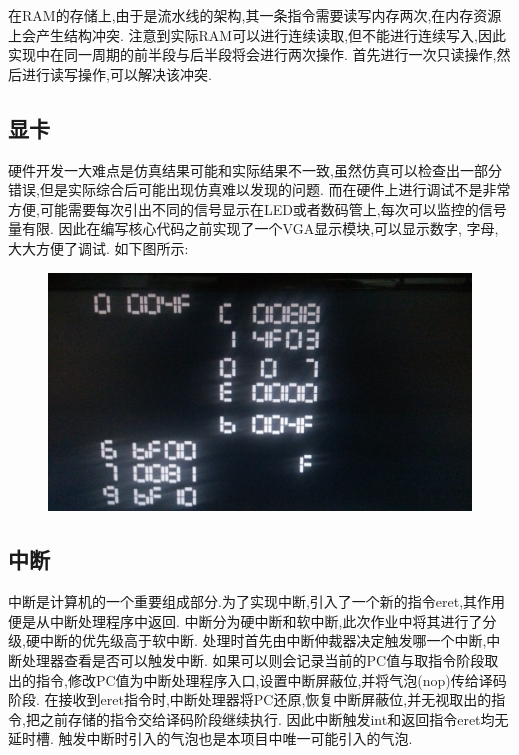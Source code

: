 在RAM的存储上,由于是流水线的架构,其一条指令需要读写内存两次,在内存资源上会产生结构冲突.
注意到实际RAM可以进行连续读取,但不能进行连续写入,因此实现中在同一周期的前半段与后半段将会进行两次操作.
首先进行一次只读操作,然后进行读写操作,可以解决该冲突.
\subsection{显卡}
硬件开发一大难点是仿真结果可能和实际结果不一致,虽然仿真可以检查出一部分错误,但是实际综合后可能出现仿真难以发现的问题.
而在硬件上进行调试不是非常方便,可能需要每次引出不同的信号显示在LED或者数码管上,每次可以监控的信号量有限.
因此在编写核心代码之前实现了一个VGA显示模块,可以显示数字, 字母, 大大方便了调试. 如下图所示:
\begin{figure}[H]
  \centering
  \includegraphics[width=\textwidth]{figure/vga.jpg}
\end{figure}

\subsection{中断}
中断是计算机的一个重要组成部分.为了实现中断,引入了一个新的指令eret,其作用便是从中断处理程序中返回.
中断分为硬中断和软中断,此次作业中将其进行了分级,硬中断的优先级高于软中断.
处理时首先由中断仲裁器决定触发哪一个中断,中断处理器查看是否可以触发中断.
如果可以则会记录当前的PC值与取指令阶段取出的指令,修改PC值为中断处理程序入口,设置中断屏蔽位,并将气泡(nop)传给译码阶段.
在接收到eret指令时,中断处理器将PC还原,恢复中断屏蔽位,并无视取出的指令,把之前存储的指令交给译码阶段继续执行.
因此中断触发int和返回指令eret均无延时槽.
触发中断时引入的气泡也是本项目中唯一可能引入的气泡.

